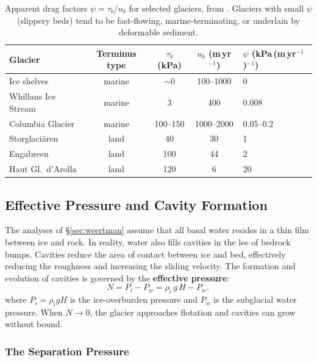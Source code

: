 \documentclass[11pt]{article}
\begin{document}
\begin{table}[ht]
\centering
\caption{Apparent drag factors $\psi = \tau_b / u_b$ for selected glaciers, from \cite{CuffeyPaterson2010}.  Glaciers with small $\psi$ (slippery beds) tend to be fast-flowing, marine-terminating, or underlain by deformable sediment.}
\label{tab:drag_factors}
\begin{tabular}{lcccl}
\toprule
\textbf{Glacier} & \textbf{Terminus type} & $\tau_b$ (kPa) & $u_b$ (m\,yr$^{-1}$) & $\psi$ (kPa\,(m\,yr$^{-1}$)$^{-1}$) \\
\midrule
Ice shelves & marine & $\sim$0 & 100--1000 & 0 \\
Whillans Ice Stream & marine & 3 & 400 & 0.008 \\
Columbia Glacier & marine & 100--150 & 1000--2000 & 0.05--0.2 \\
Storglaci\"aren & land & 40 & 30 & 1 \\
Engabreen & land & 100 & 44 & 2 \\
Haut Gl.\ d'Arolla & land & 120 & 6 & 20 \\
\bottomrule
\end{tabular}
\end{table}

\subsection{Effective Pressure and Cavity Formation}
\label{sec:effective_pressure}

The analyses of \S\ref{sec:weertman} assume that all basal water resides in a thin film between ice and rock.  In reality, water also fills cavities in the lee of bedrock bumps.  Cavities reduce the area of contact between ice and bed, effectively reducing the roughness and increasing the sliding velocity.  The formation and evolution of cavities is governed by the \textbf{effective pressure}:
\begin{equation}
  \boxed{N = P_i - P_w = \rho_i\,g\,H - P_w,}
  \label{eq:effective_pressure}
\end{equation}
where $P_i = \rho_i g H$ is the ice-overburden pressure and $P_w$ is the subglacial water pressure.  When $N \to 0$, the glacier approaches flotation and cavities can grow without bound.

\subsubsection{The Separation Pressure}
\end{document}
